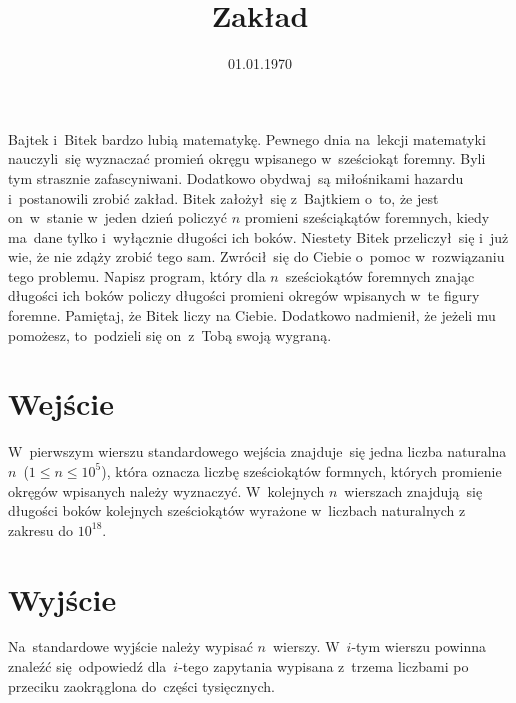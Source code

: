 \documentclass[zad]{soigstyl}
\date{01.01.1970}
\title{\mbox{Zakład}}
\begin{document}
\begin{tasktext}%
    \noindent
    Bajtek i~Bitek bardzo lubią matematykę. Pewnego dnia na~lekcji matematyki nauczyli~się wyznaczać promień okręgu wpisanego w~sześciokąt foremny. Byli tym strasznie zafascyniwani. Dodatkowo obydwaj~są miłośnikami hazardu i~postanowili zrobić zakład. Bitek założył~się z~Bajtkiem o~to, że jest on~w~stanie w~jeden dzień policzyć $n$ promieni sześciąkątów foremnych, kiedy ma~dane tylko i~wyłącznie długości ich boków. Niestety Bitek przeliczył~się i~już wie, że nie zdąży zrobić tego sam. Zwrócił~się do Ciebie o~pomoc w~rozwiązaniu tego problemu. Napisz program, który dla $n$~sześciokątów foremnych znając długości ich boków policzy długości promieni okregów wpisanych w~te figury foremne. Pamiętaj, że Bitek liczy na Ciebie. Dodatkowo nadmienił, że jeżeli mu pomożesz, to~podzieli się on~z~Tobą swoją wygraną.
	
    	\section{Wejście}
	W~pierwszym wierszu standardowego wejścia znajduje~się jedna liczba naturalna $n$~($1 \leqslant n \leqslant 10^5$), która oznacza liczbę sześciokątów formnych, których promienie okręgów wpisanych należy wyznaczyć. W~kolejnych $n$~wierszach znajdują~się długości boków kolejnych sześciokątów wyrażone w~liczbach naturalnych z zakresu do $10^{18}$.

	\section{Wyjście}
	Na~standardowe wyjście należy wypisać $n$~wierszy. W~$i$-tym wierszu powinna znaleźć się~odpowiedź dla~$i$-tego zapytania wypisana z~trzema liczbami po przeciku zaokrąglona do~części tysięcznych.
	
	\oigprzyklady
\end{tasktext}
\end{document}
